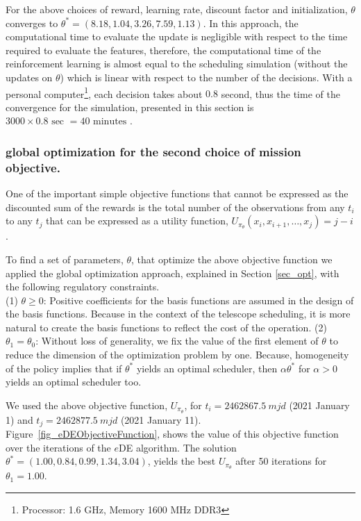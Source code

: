 \documentclass[12pt]{aastex62}
\theoremstyle{definition}
\begin{document}
For the above choices of reward, learning rate, discount factor and initialization, $\theta$ converges to $\theta^* = (8.18,  1.04,  3.26,  7.59,  1.13)$.
In this approach, the computational time to evaluate the update is negligible with respect to the time required to evaluate the features, therefore, the computational time of the reinforcement learning is almost equal to the scheduling simulation (without the updates on $\theta$) which is linear with respect to the number of the decisions. With a personal computer\footnote{Processor: 1.6 GHz, Memory 1600 MHz DDR3}, each decision takes about $0.8$ second, thus the time of the convergence for the simulation, presented in this section is $3000\times 0.8 \text{ sec } = 40 \text{ minutes }$.

\subsubsection{global optimization for the second choice of mission objective.} One of the important simple objective functions that cannot be expressed as the discounted sum of the rewards is the total number of the observations from any $t_i$ to any $t_j$ that can be expressed as a utility function, $U_{\pi_{\theta}}(x_i, x_{i+1}, \dots, x_j) = j - i$.

To find a set of parameters, $\theta$, that optimize the above objective function we applied the global optimization approach, explained in Section \ref{sec_opt}, with the following regulatory constraints.\\
(1) $\theta \geq 0$: Positive coefficients for the basis functions are assumed in the design of the basis functions. Because in the context of the telescope scheduling, it is more natural to create the basis functions to reflect the cost of the operation.
(2) $\theta_1 =\theta_0$: Without loss of generality, we fix the value of the first element of $\theta$ to reduce the dimension of the optimization problem by one. Because, homogeneity of the policy implies that if $\theta^*$ yields an optimal scheduler, then $\alpha \theta^*$ for $\alpha > 0$ yields an optimal scheduler too.

We used the above objective function, $U_{\pi_{\theta}}$, for $t_i = 2462867.5~mjd$ (2021 January 1) and $t_j = 2462877.5~mjd$ (2021 January 11). Figure~\ref{fig_eDEObjectiveFunction}, shows the value of this objective function over the iterations of the $e$DE algorithm. The solution $\theta^* = (1.00, 0.84, 0.99,  1.34,  3.04)$, yields the best $U_{\pi_{\theta}}$ after 50 iterations for $\theta_1 = 1.00$.
\end{document}
